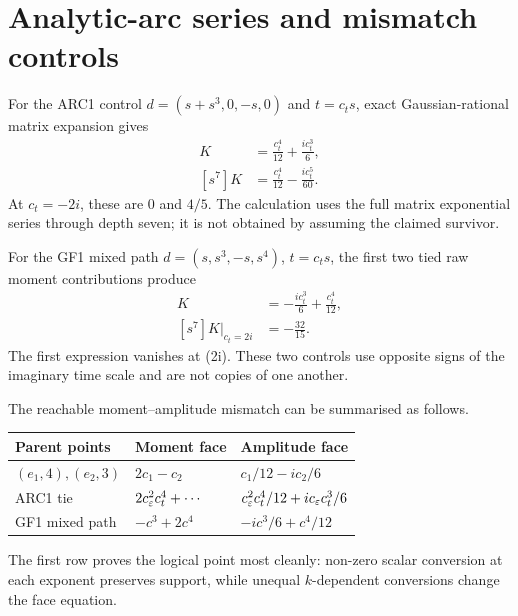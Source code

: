 \section{Analytic-arc series and mismatch controls}\label{app:arcseries}

For the ARC1 control
\(d=(s+s^3,0,-s,0)\) and \(t=c_ts\), exact Gaussian-rational matrix expansion
gives
\begin{align*}
[s^6]K&=\frac{c_t^4}{12}+\frac{ic_t^3}{6},\\
[s^7]K&=\frac{c_t^4}{12}-\frac{ic_t^5}{60}.
\end{align*}
At \(c_t=-2i\), these are \(0\) and \(4/5\).  The calculation uses the full
matrix exponential series through depth seven; it is not obtained by assuming
the claimed survivor.

For the GF1 mixed path \(d=(s,s^3,-s,s^4)\), \(t=c_ts\), the first two tied
raw moment contributions produce
\begin{align*}
[s^6]K&=-\frac{ic_t^3}{6}+\frac{c_t^4}{12},\\
[s^7]K\big|_{c_t=2i}&=-\frac{32}{15}.
\end{align*}
The first expression vanishes at (2i).  These two controls use opposite signs
of the imaginary time scale and are not copies of one another.

The reachable moment--amplitude mismatch can be summarised as follows.
\begin{center}
\begin{tabular}{lll}
\toprule
Parent points & Moment face & Amplitude face\\
\midrule
\((e_1,4),(e_2,3)\) & \(2c_1-c_2\) & \(c_1/12-ic_2/6\)\\
ARC1 tie & \(2c_\varepsilon^2c_t^4+\cdots\) & \(c_\varepsilon^2c_t^4/12+ic_\varepsilon c_t^3/6\)\\
GF1 mixed path & \(-c^3+2c^4\) & \(-ic^3/6+c^4/12\)\\
\bottomrule
\end{tabular}
\end{center}

The first row proves the logical point most cleanly: non-zero scalar conversion
at each exponent preserves support, while unequal \(k\)-dependent conversions
change the face equation.
